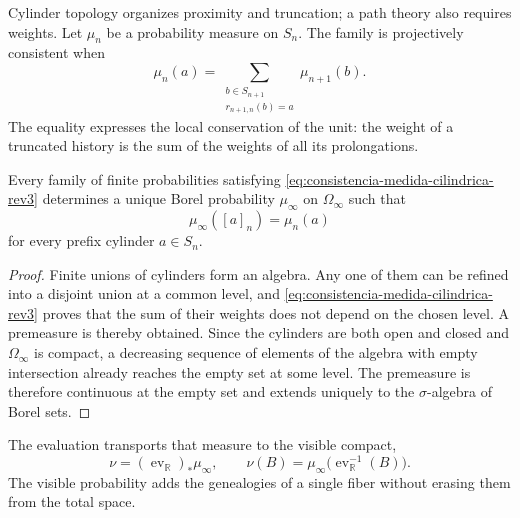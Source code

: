 Cylinder topology organizes proximity and truncation; a path theory also
requires weights. Let \(\mu_n\) be a probability measure on
\(S_n\). The family is projectively consistent when
\begin{equation}
 \mu_n(a)=
 \sum_{\substack{b\in S_{n+1}\\r_{n+1,n}(b)=a}}\mu_{n+1}(b).
 \label{eq:consistencia-medida-cilindrica-rev3}
\end{equation}
The equality expresses the local conservation of the unit: the weight of a
truncated history is the sum of the weights of all its prolongations.

\begin{theorem}
\label{thm:medida-genealogica-limite-rev3}
Every family of finite probabilities satisfying
\eqref{eq:consistencia-medida-cilindrica-rev3} determines a unique
Borel probability \(\mu_\infty\) on \(\Omega_\infty\) such that
\begin{equation}
 \mu_\infty([a]_n)=\mu_n(a)
 \label{eq:medida-cilindro-rev3}
\end{equation}
for every prefix cylinder \(a\in S_n\).
\end{theorem}

\begin{proof}
Finite unions of cylinders form an algebra. Any one of them can be refined into a disjoint union at a common level, and \eqref{eq:consistencia-medida-cilindrica-rev3} proves that the sum of their weights does not depend on the chosen level. A premeasure is thereby obtained. Since the cylinders are both open and closed and \(\Omega_\infty\) is compact, a decreasing sequence of elements of the algebra with empty intersection already reaches the empty set at some level. The premeasure is therefore continuous at the empty set and extends uniquely to the \(\sigma\)-algebra of Borel sets.
\end{proof}

The evaluation transports that measure to the visible compact,
\begin{equation}
 \nu=(\operatorname{ev}_{\mathbb R})_*\mu_\infty,
 \qquad
 \nu(B)=\mu_\infty\bigl(\operatorname{ev}_{\mathbb R}^{-1}(B)\bigr).
 \label{eq:pushforward-medida-visible-rev3}
\end{equation}
The visible probability adds the genealogies of a single fiber without
erasing them from the total space.

